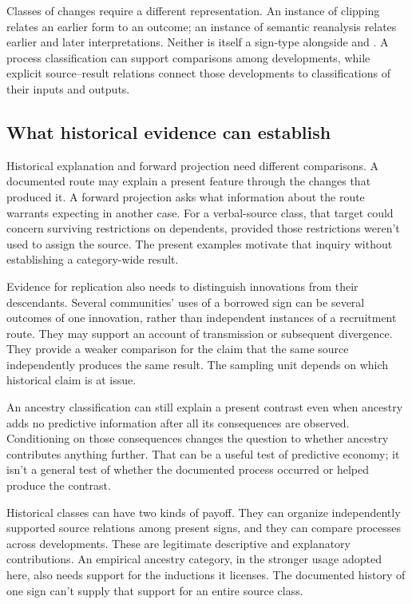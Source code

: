 \documentclass[12pt]{article}
\begin{document}
Classes of changes require a different representation. An instance of
clipping relates an earlier form to an outcome; an instance of semantic
reanalysis relates earlier and later interpretations. Neither is itself
a sign-type alongside  and . A process
classification can support comparisons among developments, while explicit
source--result relations connect those developments to classifications
of their inputs and outputs.

\subsection{What historical evidence can establish}

Historical explanation and forward projection need different comparisons.
A documented route may explain a present feature through the changes
that produced it. A forward projection asks what information about the
route warrants expecting in another case. For a verbal-source class,
that target could concern surviving restrictions on dependents, provided
those restrictions weren't used to assign the source. The present
examples motivate that inquiry without establishing a category-wide result.

Evidence for replication also needs to distinguish innovations from their
descendants. Several communities' uses of a borrowed sign can be
several outcomes of one innovation, rather than independent instances
of a recruitment route. They may support an account of transmission
or subsequent divergence. They provide a weaker comparison for the
claim that the same source independently produces the same result.
The sampling unit depends on which historical claim is at issue.

An ancestry classification can still explain a present contrast even
when ancestry adds no predictive information after all its consequences
are observed. Conditioning on those consequences changes the question
to whether ancestry contributes anything further. That can be a useful
test of predictive economy; it isn't a general test of whether the
documented process occurred or helped produce the contrast.

Historical classes can have two kinds of payoff. They can
organize independently supported source relations among present signs,
and they can compare processes across developments. These are legitimate
descriptive and explanatory contributions. An empirical ancestry category,
in the stronger usage adopted here, also needs support for the
inductions it licenses. The documented history of one sign can't supply
that support for an entire source class.
\end{document}
